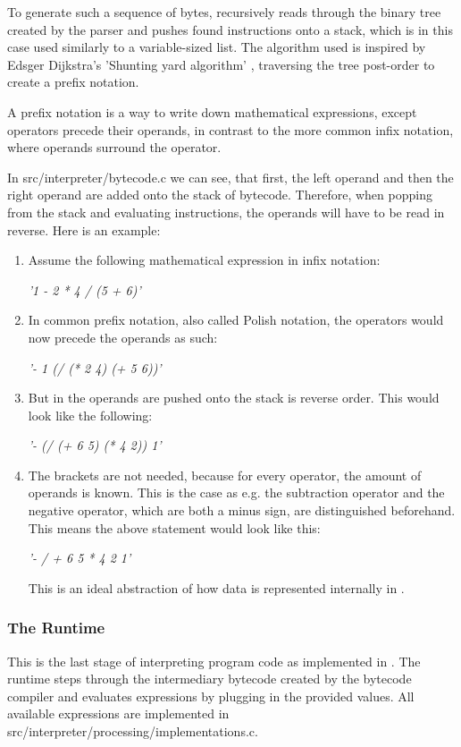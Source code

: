 \documentclass[12pt,a4paper]{report}
\newcommand{\cte}[1] {
    \cite{#1}
}
\newcommand{\expr}[1] {
    \begin{center}
        #1
    \end{center}
}
\begin{document}
To generate such a sequence of bytes, \name recursively reads through the
binary tree created by the parser and pushes found instructions onto a stack,
which is in this case used similarly to a variable-sized list.
The algorithm used is inspired by Edsger Dijkstra's 'Shunting yard 
algorithm'\cte{shunting_yard}, traversing the tree post-order to create
a prefix notation. 

A prefix notation is a way to write down mathematical expressions, except
operators precede their operands, in contrast to the more common infix notation,
where operands surround the operator.

In src/interpreter/bytecode.c we can see, that first, the left operand and then
the right operand are added onto the stack of bytecode. Therefore, when
popping from the stack and evaluating instructions, the operands will have to
be read in reverse.
Here is an example:
\begin{enumerate}
    \item Assume the following mathematical expression in infix notation:
        \expr{\emph{'1 - 2 * 4 / (5 + 6)'}}
    \item In common prefix notation, also called Polish notation, the
        operators would now precede the operands as such:
        \expr{\emph{'- 1 (/ (* 2 4) (+ 5 6))'}}
    \item But in \name the operands are pushed onto the stack is reverse order.
        This would look like the following:
        \expr{\emph{'- (/ (+ 6 5) (* 4 2)) 1'}}
    \item The brackets are not needed, because for every operator, the amount
        of operands is known. This is the case as e.g. the subtraction operator
        and the negative operator, which are both a minus sign, are distinguished
        beforehand. This means the above statement would look like this:
        \expr{\emph{'- / + 6 5 * 4 2 1'}}
        This is an ideal abstraction of how data 
        is represented internally in \name.
\end{enumerate}

\subsubsection{The Runtime}
This is the last stage of interpreting program code as implemented in \name.
The runtime steps through the intermediary bytecode created by the bytecode
compiler and evaluates expressions by plugging in the provided values.
All available expressions are implemented in 
src/interpreter/processing/implementations.c.
\end{document}
